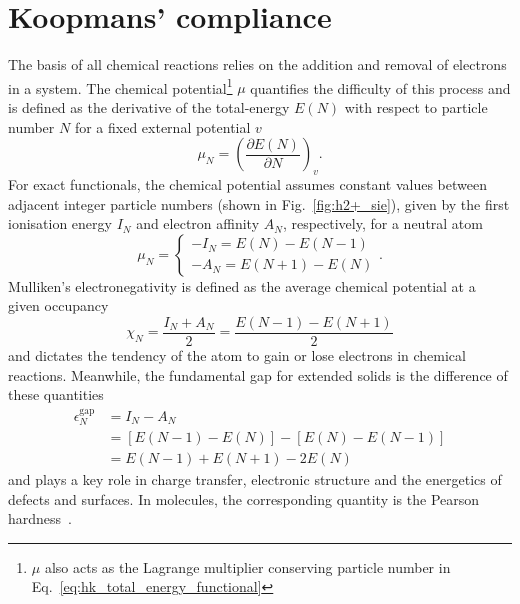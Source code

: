 {%
\section{Koopmans' compliance}
\label{sec:koopmans_condition}

%
The basis of all chemical reactions 
relies on the addition and removal of electrons 
in a system.
%
The chemical potential\footnote{$\mu$ 
also acts as the Lagrange multiplier 
conserving particle number 
in Eq.~\eqref{eq:hk_total_energy_functional}}
$\mu$ quantifies the difficulty 
of this process 
and is defined as the derivative of 
the total-energy $E(N)$
with respect to particle number $N$ 
for a fixed external potential $v$
%
\begin{equation}
\mu_N=\left(\frac{\partial E(N)}{\partial N}\right)_v.
\end{equation}
%
For exact functionals, 
the chemical potential assumes 
constant values between 
adjacent integer particle numbers 
(shown in Fig.~\ref{fig:h2+_sie}), 
given by the first ionisation energy $I_N$ 
and electron affinity $A_N$, respectively, 
for a neutral atom
%
\begin{equation}
\mu_N=\left\{\begin{array}{c} 
-I_N=E(N)-E(N-1)\\
-A_N=E(N+1)-E(N)
\end{array}\right. .
\end{equation}
%
Mulliken's electronegativity 
is defined as the average chemical potential 
at a given occupancy 
%
\begin{equation}
\chi_N=\frac{I_N+A_N}{2} = \frac{E(N-1)-E(N+1)}{2}
\end{equation}
%
and dictates the tendency 
of the atom 
to gain or lose electrons 
in chemical reactions.
%
Meanwhile, 
the fundamental gap 
for extended solids 
is the difference of these quantities 
%
\begin{align}
\epsilon_N^\textrm{gap}&=I_N-A_N\nonumber\\
				&=[E(N-1)-E(N)]-[E(N)-E(N-1)]\nonumber\\
				&=E(N-1)+E(N+1)-2E(N)
\end{align}
%
and plays a key role in 
charge transfer, 
electronic structure 
and the energetics 
of defects and surfaces.
%
In molecules, 
the corresponding quantity is 
the Pearson hardness~\cite{parr1983absolute}.
%

}
